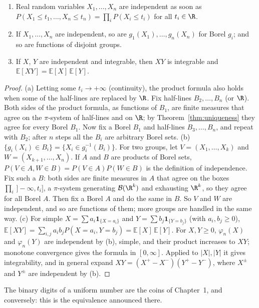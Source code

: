 \begin{proposition}\label{prop:indepcdf}
\begin{enumerate}[label=(\alph*)]
\item Real random variables $X_1,\dots,X_n$ are independent as soon as $P(X_1\le t_1,\dots,X_n\le t_n)=\prod_iP(X_i\le t_i)$ for all $t_i\in\R$.
\item If $X_1,\dots,X_n$ are independent, so are $g_1(X_1),\dots,g_n(X_n)$ for Borel $g_i$; and so are functions of disjoint groups.
\item If $X$, $Y$ are independent and integrable, then $XY$ is integrable and $\mathbb E[XY]=\mathbb E[X]\,\mathbb E[Y]$.
\end{enumerate}
\end{proposition}
\begin{proof}
(a) Letting some $t_i\to+\infty$ (continuity), the product formula also holds when some of the half-lines are replaced by $\R$.
Fix half-lines $B_2,\dots,B_n$ (or $\R$). Both sides of the product formula, as functions of $B_1$, are finite measures that agree on
the $\pi$-system of half-lines and on $\R$; by Theorem~\ref{thm:uniqueness} they agree for every Borel $B_1$. Now fix a Borel $B_1$ and
half-lines $B_3,\dots,B_n$, and repeat with $B_2$; after $n$ steps all the $B_i$ are arbitrary Borel sets.
(b) $\{g_i(X_i)\in B_i\}=\{X_i\in g_i^{-1}(B_i)\}$. For two groups, let $V=(X_1,\dots,X_k)$ and $W=(X_{k+1},\dots,X_n)$. If $A$ and $B$ are
products of Borel sets, $P(V\in A,W\in B)=P(V\in A)P(W\in B)$ is the definition of independence. Fix such a $B$: both sides are
finite measures in $A$ that agree on the boxes $\prod_i\,]-\infty,t_i]$, a $\pi$-system generating $\mathcal B(\R^k)$ and exhausting $\R^k$, so they agree
for all Borel $A$. Then fix a Borel $A$ and do the same in $B$. So $V$ and $W$ are independent, and so are functions of them;
more groups are handled in the same way.
(c) For simple $X=\sum a_i\mathbf 1_{\{X=a_i\}}$ and $Y=\sum b_j\mathbf 1_{\{Y=b_j\}}$ (with $a_i,b_j\ge0$),
$\mathbb E[XY]=\sum_{i,j}a_ib_jP(X=a_i,Y=b_j)=\mathbb E[X]\,\mathbb E[Y]$. For $X,Y\ge0$, $\varphi_n(X)$ and $\varphi_n(Y)$ are independent by (b), simple, and their
product increases to $XY$; monotone convergence gives the formula in $[0,\infty]$. Applied to $|X|,|Y|$ it gives integrability, and
in general expand $XY=(X^+-X^-)(Y^+-Y^-)$, where $X^\pm$ and $Y^\pm$ are independent by (b).
\end{proof}

The binary digits of a uniform number are the coins of Chapter~1, and conversely: this is the equivalence announced
there.

